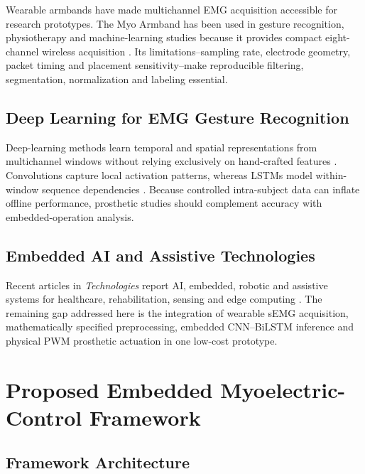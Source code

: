\documentclass[technologies,article,submit,pdftex,moreauthors]{Definitions/mdpi}
\begin{document}
Wearable armbands have made multichannel EMG acquisition accessible for research prototypes. The Myo Armband has been used in gesture recognition, physiotherapy and machine-learning studies because it provides compact eight-channel wireless acquisition \cite{He2017Myo,Kaya2018Myo,Sathiyanarayanan2016Myo,Boyali2015Myo,Benalcazar2017Myo}. Its limitations--sampling rate, electrode geometry, packet timing and placement sensitivity--make reproducible filtering, segmentation, normalization and labeling essential.

\subsection{Deep Learning for EMG Gesture Recognition}

Deep-learning methods learn temporal and spatial representations from multichannel windows without relying exclusively on hand-crafted features \cite{LeCun2015,Tsinganos2018,Nahid2020Myo,Chung2019Myo,Celik2026}. Convolutions capture local activation patterns, whereas LSTMs model within-window sequence dependencies \cite{Hochreiter1997}. Because controlled intra-subject data can inflate offline performance, prosthetic studies should complement accuracy with embedded-operation analysis.

\subsection{Embedded AI and Assistive Technologies}

Recent articles in \textit{Technologies} report AI, embedded, robotic and assistive systems for healthcare, rehabilitation, sensing and edge computing \cite{Dunai2025Tech,Covaciu2025Tech,Lotfi2018Tech,Stasolla2023Tech,Bush2024Tech,Giansanti2025Tech,Manakitsa2024Tech,Percuku2025Tech,Jalloul2025Tech,Kouretas2020Tech,Kraft2020Tech,Sanida2022Tech}. The remaining gap addressed here is the integration of wearable sEMG acquisition, mathematically specified preprocessing, embedded CNN--BiLSTM inference and physical PWM prosthetic actuation in one low-cost prototype.

\section{Proposed Embedded Myoelectric-Control Framework}

\subsection{Framework Architecture}
\end{document}
